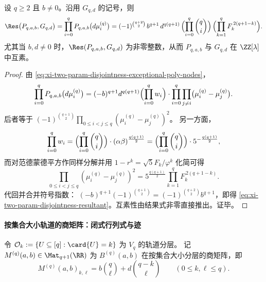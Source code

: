 \begin{theorem}\label{thm:xi-two-param-disjointness-resultant-integer-fibonacci}
设 \(q\ge 2\) 且 \(b\neq 0\)。沿用 \(G_{q,d}\) 的记号，则
\begin{equation}\label{eq:xi-two-param-disjointness-resultant}
\Res\bigl(P_{q,a,b},G_{q,d}\bigr)
=\prod_{i=0}^q P_{q,a,b}\bigl(d\mu_i^{(q)}\bigr)
=(-1)^{\binom{q+2}{2}}\,
b^{q+1}\,d^{q(q+1)}\,
\Bigl(\prod_{i=0}^q\binom{q}{i}\Bigr)\,
\Bigl(\prod_{k=1}^q F_k^{\,2(q+1-k)}\Bigr).
\end{equation}
尤其当 \(b,d\neq 0\) 时，\(\Res(P_{q,a,b},G_{q,d})\) 为非零整数，从而 \(P_{q,a,b}\) 与 \(G_{q,d}\) 在 \(\ZZ[\lambda]\) 中互素。
\end{theorem}
\begin{proof}
由 \eqref{eq:xi-two-param-disjointness-exceptional-poly-nodes}，
\[
\prod_{i=0}^q P_{q,a,b}\bigl(d\mu_i^{(q)}\bigr)
=(-b)^{q+1}d^{q(q+1)}\Bigl(\prod_{i=0}^q w_i\Bigr)\cdot
\prod_{i=0}^q\prod_{j\ne i}\bigl(\mu_i^{(q)}-\mu_j^{(q)}\bigr).
\]
后者等于
\(
(-1)^{\binom{q+1}{2}}\prod_{0\le i<j\le q}(\mu_i^{(q)}-\mu_j^{(q)})^2
\)。
另一方面，
\[
\prod_{i=0}^q w_i
=\Bigl(\prod_{i=0}^q\binom{q}{i}\Bigr)\cdot(\alpha\beta)^{\frac{q(q+1)}{2}}
=\Bigl(\prod_{i=0}^q\binom{q}{i}\Bigr)\cdot 5^{-\frac{q(q+1)}{2}},
\]
而对范德蒙德平方作同样分解并用 \(1-r^k=\sqrt5 F_k/\varphi^k\) 化简可得
\[
\prod_{0\le i<j\le q}(\mu_i^{(q)}-\mu_j^{(q)})^2
=5^{\frac{q(q+1)}{2}}\prod_{k=1}^q F_k^{\,2(q+1-k)}.
\]
代回并合并符号指数：
\(
(-b)^{q+1}(-1)^{\binom{q+1}{2}}=(-1)^{\binom{q+2}{2}}b^{q+1}
\)，即得 \eqref{eq:xi-two-param-disjointness-resultant}。互素性由结果式非零直接推出。证毕。
\end{proof}

\paragraph{按集合大小轨道的商矩阵：闭式行列式与迹}
令 \(\mathcal O_k:=\{U\subseteq[q]:\card{U}=k\}\) 为 \(V_q\) 的轨道分层。
记 \(M^{(q)}(a,b)\in\Mat_{q+1}(\RR)\) 为 \(B^{(q)}(a,b)\) 在按集合大小分层的商矩阵，即
\begin{equation}\label{eq:xi-two-param-disjointness-quotient-matrix}
M^{(q)}(a,b)_{k,\ell}=b\binom{q}{\ell}+d\binom{q-k}{\ell}\qquad(0\le k,\ell\le q).
\end{equation}

